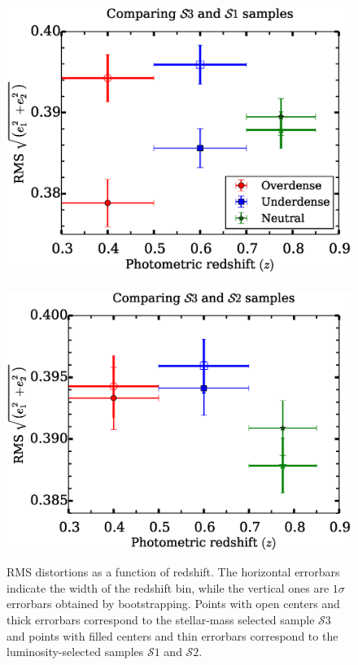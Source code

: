 \documentclass[twocolumn,useAMS,usenatbib]{mn2e}
\newcommand{\s}{\ensuremath{\mathcal{S}}}
\begin{document}
\begin{figure}
 \centering
 \includegraphics[width=1.0\columnwidth]{rms_ellip_momentbased_noevolution_wide} \
 \includegraphics[width=1.0\columnwidth]{rms_ellip_momentbased_Bbandevolution_wide}
 \caption{ RMS distortions as a function of redshift. The horizontal errorbars indicate
           the width of the redshift bin, while the vertical ones are $1\sigma$ errorbars obtained by
           bootstrapping. Points with open centers and thick errorbars correspond to the stellar-mass selected sample \s$3$
           and points with filled centers and thin errorbars correspond to the luminosity-selected samples \s$1$ and \s$2$.    
         }
 \label{fig:rms_ellip_momentbased_wide}         
\end{figure}
\end{document}
